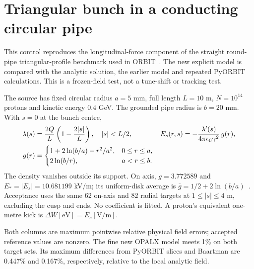 \clearpage
\section{Triangular bunch in a conducting circular pipe}
\label{sec:triangle-pipe}
This control reproduces the longitudinal-force component of the straight
round-pipe triangular-profile benchmark used in ORBIT~\cite{orbit2006,pyorbit3triangle}.
The new explicit  model is compared with the
analytic solution, the earlier  model and repeated PyORBIT
calculations. This is a frozen-field test, not a tune-shift or tracking test.

The source has fixed circular radius $a=5$ mm, full length $L=10$ m,
$N=10^{14}$ protons and kinetic energy $0.4$ GeV. The grounded pipe radius
is $b=20$ mm. With $s=0$ at the bunch centre,
\begin{align}
 \lambda(s)&=\frac{2Q}{L}\left(1-\frac{2|s|}{L}\right),\quad |s|<L/2,
 & E_s(r,s)&=-\frac{\lambda'(s)}{4\pi\epsilon_0\gamma^2}\,g(r),\label{eq:triangle-pipe}\\
 g(r)&=\begin{cases}
 1+2\ln(b/a)-r^2/a^2,&0\le r\le a,\\
 2\ln(b/r),&a<r\le b.
 \end{cases}
 \label{eq:triangle-pointwise-g}
\end{align}
The density vanishes outside its support. On axis, $g=3.772589$ and
$E_*=|E_s|=10.681199$ kV/m; its uniform-disk average is
$\overline g=1/2+2\ln(b/a)$~\cite{baartman}.
Acceptance uses the same 62 on-axis and 82 radial targets at
$1\le|s|\le4$ m, excluding the cusp and ends. No coefficient is fitted.
A proton's equivalent one-metre kick is $\Delta W[\mathrm{eV}]=E_s[\mathrm{V/m}]$.

Both columns are maximum pointwise relative physical field errors; accepted
reference values are nonzero. The fine new OPALX model meets 1\% on both
target sets. Its maximum differences from PyORBIT slices and Baartman
are 0.447\% and 0.167\%, respectively, relative to the local analytic field.

